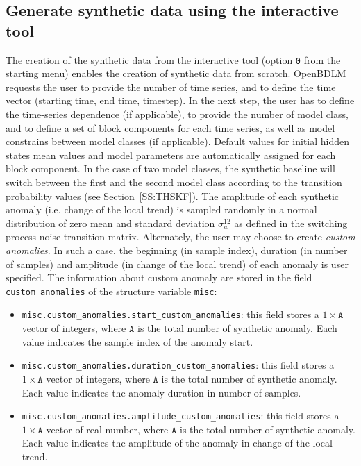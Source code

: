 \subsection{Generate synthetic data using the interactive tool}
The creation of the synthetic data from the interactive tool (option \colorbox{light-gray}{\lstinline[basicstyle = \mlttfamily \small, backgroundcolor = \color{light-gray}]!0!} from the starting menu) enables the creation of synthetic data from scratch. 
OpenBDLM requests the user to provide the number of time series, and to define the time vector (starting time, end time, timestep).
In the next step, the user has to define the time-series dependence (if applicable), to provide the number of model class, and to define a set of block components for each time series, as well as model constrains between model classes (if applicable).
Default values for initial hidden states mean values and model parameters are automatically assigned for each block component.
In the case of two model classes, the synthetic baseline will switch between the first and the second model class according to the transition probability values (see Section~\ref{SS:THSKF}).
The amplitude of each synthetic anomaly (i.e. change of the local trend) is sampled randomly in a normal distribution of zero mean and standard deviation $\sigma_{w}^{12}$ as defined in the switching process noise transition matrix.
Alternately, the user may choose to create \emph{custom anomalies}.
In such a case, the beginning (in sample index), duration (in number of samples) and amplitude (in change of the local trend) of each anomaly is user specified.
The information about custom anomaly are stored in the field \lstinline[basicstyle = \mlttfamily \small, backgroundcolor = \color{light-gray}]!custom_anomalies! of the structure variable \lstinline[basicstyle = \mlttfamily \small, backgroundcolor = \color{light-gray}]!misc!:
\begin{itemize}
\item \lstinline[basicstyle = \mlttfamily \small, backgroundcolor = \color{light-gray}]!misc.custom_anomalies.start_custom_anomalies!: this field stores a $1\times \mathtt{A}$ vector of integers, where $\mathtt{A}$ is the total number of synthetic anomaly. Each value indicates the sample index of the anomaly start.
\item \lstinline[basicstyle = \mlttfamily \small, backgroundcolor = \color{light-gray}]!misc.custom_anomalies.duration_custom_anomalies!: this field stores a $1\times \mathtt{A}$ vector of integers, where $\mathtt{A}$ is the total number of synthetic anomaly. Each value indicates the anomaly duration in number of samples.
\item \lstinline[basicstyle = \mlttfamily \small, backgroundcolor = \color{light-gray}]!misc.custom_anomalies.amplitude_custom_anomalies!: this field stores a $1\times \mathtt{A}$ vector of real number, where $\mathtt{A}$ is the total number of synthetic anomaly. Each value indicates the amplitude of the anomaly in change of the local trend.
\end{itemize}
